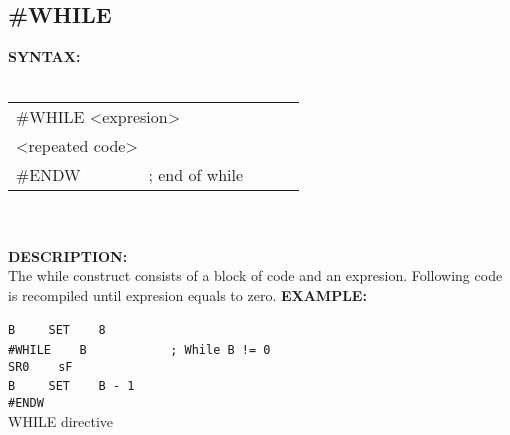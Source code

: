                 \subsection{\#WHILE}
                \textbf{SYNTAX:}\\
                \\ {
                        \texttt{}
                            \begin{tabular}[h!]{llll}
                                { \color{highlight_directive} \#WHILE }
                                { \color{highlight_constant} <expresion> }\verb'       '\\
                                { \color{highlight_symbol} <repeated code> }\\
                                { \color{highlight_directive} \#ENDW }\verb'       ' { \color{highlight_comment} ; end of while  }
                            \end{tabular}
                    }\\
                    \\
                \textbf{DESCRIPTION:}\\
                The while construct consists of a block of code and an expresion. Following code is recompiled until expresion equals to zero.
                \textbf{EXAMPLE:}\\
                        \begin{code}[h!]
                            {\color{highlight_symbol}\verb'B'}\verb'    '
                            {\color{highlight_directive}\verb'SET'}\verb'    '{\color{highlight_constant}\verb'8'}\\
                            {\color{highlight_directive}\verb'#WHILE'}\verb'    '{\color{highlight_constant}\verb'B'}\verb'          '
                            {\color{highlight_comment}\verb' ; While B != 0'}\\
                            {\color{highlight_instruction}\verb'SR0'}\verb'    '{\color{highlight_symbol}\verb'sF'}\\
                            {\color{highlight_symbol}\verb'B'}\verb'    '
                            {\color{highlight_directive}\verb'SET'}\verb'    '{\color{highlight_constant}\verb'B - 1'}\\
                            {\color{highlight_directive}\verb'#ENDW'}\\
                            \caption{WHILE directive}
                        \end{code}

